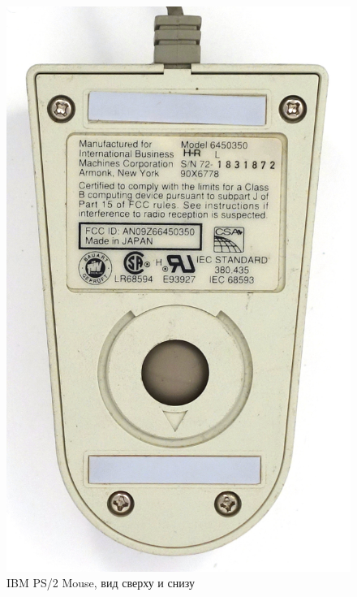 \documentclass[11pt, a4paper]{article}
\begin{document}
\begin{figure}[h]
    \includegraphics[scale=0.6]{1987_ibm_ps2_mouse/num2.JPG}
    \caption{IBM PS/2 Mouse, вид сверху и снизу}
    \label{fig:IMBPS2TopBottom}
\end{figure}
\end{document}
